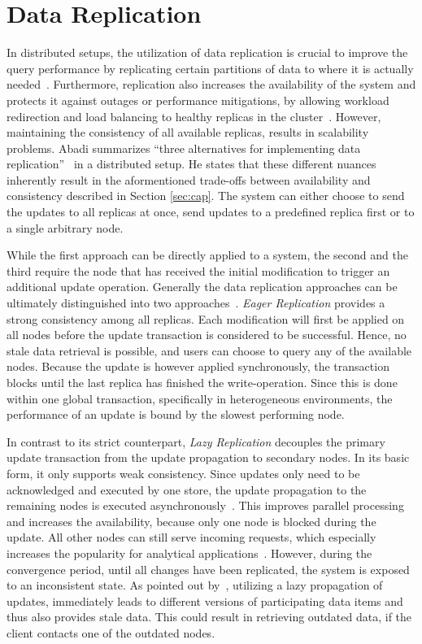 


\section{Data Replication}

In distributed setups, the utilization of data replication is crucial to improve the query performance
by replicating certain partitions of data to where it is actually needed~\cite{cloudpart_2012}.
Furthermore, replication also increases the availability of the system and protects it against outages or performance mitigations,
by allowing workload redirection and load balancing to healthy replicas in the cluster~\cite{quorums:2003}.
However, maintaining the consistency of all available replicas, results in scalability problems.
Abadi summarizes ``three alternatives for implementing data replication''~\cite{abadi2012} in a distributed setup.
He states that these different nuances inherently result in the aformentioned trade-offs between availability and consistency described in Section \ref{sec:cap}.
The system can either choose to send the updates to all replicas at once, send updates to a predefined replica first or to a single arbitrary node.

While the first approach can be directly applied to a system, the second and the third require the node that has received the initial modification to trigger an additional update operation.
Generally the data replication approaches can be ultimately distinguished into two approaches~\cite{gray:1996}.
\emph{Eager Replication} provides a strong consistency among all replicas. Each modification will first be applied on all nodes
before the update transaction is considered to be successful. Hence, no stale data retrieval is possible, and users can choose to query any of the available nodes.
Because the update is however applied synchronously, the transaction blocks until the last replica has finished the write-operation. 
Since this is done within one global transaction, specifically in heterogeneous environments, the performance of an update is bound by the slowest performing node.

In contrast to its strict counterpart, \emph{Lazy Replication} decouples the primary update transaction from the update propagation to secondary nodes.
In its basic form, it only supports weak consistency. Since updates only need to be acknowledged and executed by one store, 
the update propagation to the remaining nodes is executed asynchronously~\cite{fekete:2018}.
This improves parallel processing and increases the availability, because only one node is blocked during the update. All other nodes can still serve incoming requests,
which especially increases the popularity for analytical applications~\cite{daudjee:2006}.
However, during the convergence period, until all changes have been replicated, the system is exposed to an inconsistent state.
As pointed out by~\cite{cho:2000}, utilizing a lazy propagation of updates, immediately leads to different versions of participating data items and thus also provides stale data.
This could result in retrieving outdated data, if the client contacts one of the outdated nodes.

